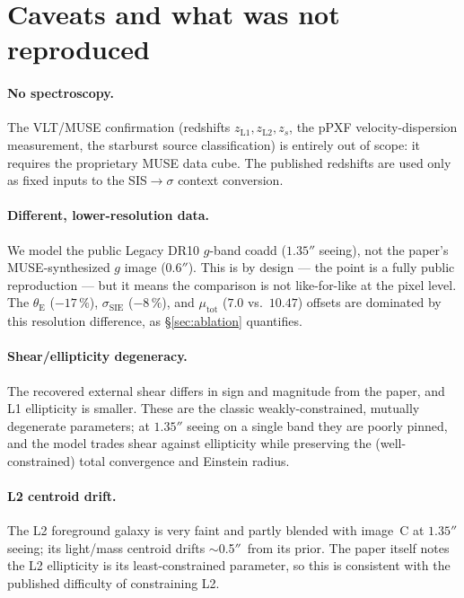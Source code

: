\documentclass[11pt,letterpaper]{article}
\newcommand{\thetaE}{\ensuremath{\theta_{\mathrm{E}}}}
\newcommand{\sigmaSIE}{\ensuremath{\sigma_{\mathrm{SIE}}}}
\renewcommand{\arcsec}{\ensuremath{''}}
\begin{document}
\section{Caveats and what was not reproduced}

\paragraph{No spectroscopy.} The VLT/MUSE confirmation
(redshifts $z_{\mathrm{L1}}, z_{\mathrm{L2}}, z_s$, the pPXF
velocity-dispersion measurement, the starburst source classification) is
entirely out of scope: it requires the proprietary MUSE data cube. The
published redshifts are used only as fixed inputs to the SIS$\to\sigma$
context conversion.

\paragraph{Different, lower-resolution data.} We model the public Legacy
DR10 $g$-band coadd ($1.35\arcsec$ seeing), not the paper's
MUSE-synthesized $g$ image ($0.6\arcsec$). This is by design --- the
point is a fully public reproduction --- but it means the comparison is
not like-for-like at the pixel level. The $\thetaE$ ($-17\,\%$),
$\sigmaSIE$ ($-8\,\%$), and $\mu_{\mathrm{tot}}$ ($7.0$ vs.\ $10.47$)
offsets are dominated by this resolution difference, as
\S\ref{sec:ablation} quantifies.

\paragraph{Shear/ellipticity degeneracy.} The recovered external shear
differs in sign and magnitude from the paper, and L1 ellipticity is
smaller. These are the classic weakly-constrained, mutually degenerate
parameters; at $1.35\arcsec$ seeing on a single band they are poorly
pinned, and the model trades shear against ellipticity while preserving
the (well-constrained) total convergence and Einstein radius.

\paragraph{L2 centroid drift.} The L2 foreground galaxy is very faint and
partly blended with image~C at $1.35\arcsec$ seeing; its light/mass
centroid drifts $\sim$0.5\arcsec\ from its prior. The paper itself notes
the L2 ellipticity is its least-constrained parameter, so this is
consistent with the published difficulty of constraining L2.
\end{document}
